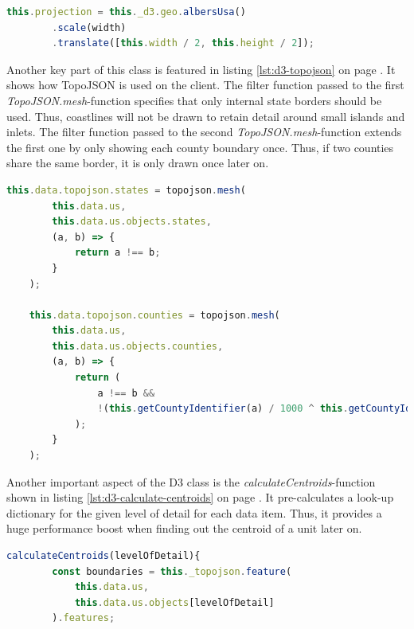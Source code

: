 \begin{description}
\begin{lstlisting}[language=JavaScript, caption={Map initialisation with a map projection, scale, and translation.}, label={lst:d3-map-init}]
    this.projection = this._d3.geo.albersUsa()
        .scale(width)
        .translate([this.width / 2, this.height / 2]);
\end{lstlisting}

Another key part of this class is featured in listing \ref{lst:d3-topojson} on page \pageref{lst:d3-topojson}. It shows how TopoJSON is used on the client. The filter function passed to the first \textit{TopoJSON.mesh}-function specifies that only internal state borders should be used. Thus, coastlines will not be drawn to retain detail around small islands and inlets. The filter function passed to the second \textit{TopoJSON.mesh}-function extends the first one by only showing each county boundary once. Thus, if two counties share the same border, it is only drawn once later on.

\begin{lstlisting}[language=JavaScript, caption={TopoJSON usage on the client with the adaption of merging all geographic information.}, label={lst:d3-topojson}]
    this.data.topojson.states = topojson.mesh(
        this.data.us,
        this.data.us.objects.states,
        (a, b) => {
            return a !== b;
        }
    );

    this.data.topojson.counties = topojson.mesh(
        this.data.us,
        this.data.us.objects.counties,
        (a, b) => {
            return (
                a !== b &&
                !(this.getCountyIdentifier(a) / 1000 ^ this.getCountyIdentifier(b) / 1000)
            );
        }
    );
\end{lstlisting}

Another important aspect of the \ac{D3} class is the \textit{calculateCentroids}-function shown in listing \ref{lst:d3-calculate-centroids} on page \pageref{lst:d3-calculate-centroids}. It pre-calculates a look-up dictionary for the given level of detail for each data item. Thus, it provides a huge performance boost when finding out the centroid of a unit later on.

\begin{lstlisting}[language=JavaScript, caption={Calculate a look-up dictionary for all data items depending on the level of detail.}, label={lst:d3-calculate-centroids}]
    calculateCentroids(levelOfDetail){
        const boundaries = this._topojson.feature(
            this.data.us,
            this.data.us.objects[levelOfDetail]
        ).features;


\end{lstlisting}
\end{description}
